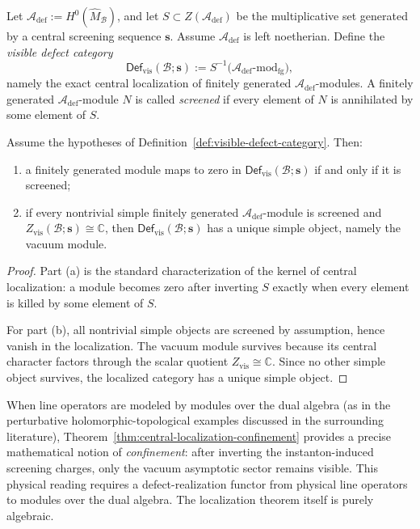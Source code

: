 \begin{definition}
Let $\mathcal A_{\mathrm{def}}:=H^0(\widehat M_{\mathcal B})$, and let $S\subset Z(\mathcal A_{\mathrm{def}})$ be the
multiplicative set generated by a central screening sequence $\mathbf s$.
Assume $\mathcal A_{\mathrm{def}}$ is left noetherian.
Define the \emph{visible defect category}
\[
\mathsf{Def}_{\mathrm{vis}}(\mathcal B;\mathbf s)
:=S^{-1}\bigl(\mathcal A_{\mathrm{def}}\text{-}\mathrm{mod}_{\mathrm{fg}}\bigr),
\]
namely the exact central localization of finitely generated $\mathcal A_{\mathrm{def}}$-modules.
A finitely generated $\mathcal A_{\mathrm{def}}$-module $N$ is called \emph{screened} if every element of $N$
is annihilated by some element of $S$.
\end{definition}

\begin{theorem}
Assume the hypotheses of Definition~\ref{def:visible-defect-category}.
Then:
\begin{enumerate}[label=(\alph*)]
\item a finitely generated module maps to zero in $\mathsf{Def}_{\mathrm{vis}}(\mathcal B;\mathbf s)$ if and only if it is screened;
\item if every nontrivial simple finitely generated $\mathcal A_{\mathrm{def}}$-module is screened and
$Z_{\mathrm{vis}}(\mathcal B;\mathbf s)\cong \mathbb C$, then $\mathsf{Def}_{\mathrm{vis}}(\mathcal B;\mathbf s)$ has a unique simple object,
namely the vacuum module.
\end{enumerate}
\end{theorem}

\begin{proof}
Part (a) is the standard characterization of the kernel of central localization: a module becomes zero after
inverting $S$ exactly when every element is killed by some element of $S$.

For part (b), all nontrivial simple objects are screened by assumption, hence vanish in the localization.
The vacuum module survives because its central character factors through the scalar quotient
$Z_{\mathrm{vis}}\cong \mathbb C$. Since no other simple object survives, the localized category has a unique
simple object.
\end{proof}

\begin{remark}
When line operators are modeled by modules over the dual algebra (as in the perturbative holomorphic-topological
examples discussed in the surrounding literature), Theorem~\ref{thm:central-localization-confinement}
provides a precise mathematical notion of \emph{confinement}: after inverting the instanton-induced screening
charges, only the vacuum asymptotic sector remains visible.
This physical reading requires a defect-realization functor from physical line operators to modules over the
dual algebra. The localization theorem itself is purely algebraic.
\end{remark}

